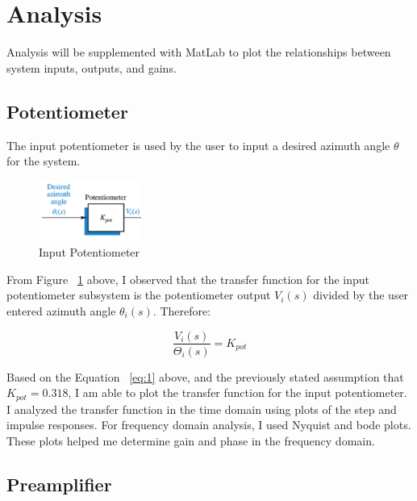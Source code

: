 \documentclass[12pt]{article}
\begin{document}
\section{Analysis}

Analysis will be supplemented with MatLab to plot the relationships between system inputs, outputs, and gains.

\subsection{Potentiometer}

The input potentiometer is used by the user to input a desired azimuth angle $\theta$ for the system.

\begin{figure}[H]
\begin{center}
	\includegraphics[width=0.3\textwidth]{./img/PotentiometerBlock.png}
	\caption{\label{fig:pot}Input Potentiometer}
\end{center}
\end{figure}

From Figure ~\ref{fig:pot} above, I observed that the transfer function for the input potentiometer subsystem is the potentiometer output $V_{i}(s)$ divided by the user entered azimuth angle $\theta_{i}(s)$. Therefore:

\begin{equation}
\frac{V_{i}(s)}{\Theta_i(s)} = K_{pot}\label{eq:1}
\end{equation}

Based on the Equation ~\ref{eq:1} above, and the previously stated assumption that $K_{pot} = 0.318$, I am able to plot the transfer function for the input potentiometer. I analyzed the transfer function in the time domain using plots of the step and impulse responses. For frequency domain analysis, I used Nyquist and bode plots. These plots helped me determine gain and phase in the frequency domain.


\subsection{Preamplifier}
\end{document}
